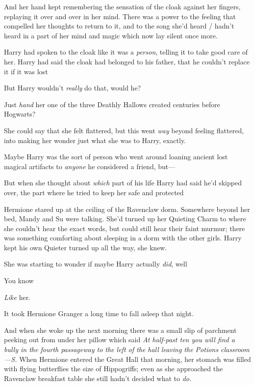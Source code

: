 And her hand kept remembering the sensation of the cloak against her fingers,
replaying it over and over in her mind. There was a power to the feeling that
compelled her thoughts to return to it, and to the song she'd heard / hadn't
heard in a part of her mind and magic which now lay silent once more.

Harry had spoken to the cloak like it was a \emph{person}, telling it to take
good care of her. Harry had said the cloak had belonged to his father, that he
couldn't replace it if it was lost{\el}

But{\el} Harry wouldn't \emph{really} do that, would he?

Just \emph{hand} her one of the three Deathly Hallows created centuries before
Hogwarts?

She could say that she felt flattered, but this went \emph{way} beyond feeling
flattered, into making her wonder just what she was to Harry, exactly.

Maybe Harry was the sort of person who went around loaning ancient lost magical
artifacts to \emph{anyone} he considered a friend, but---

But when she thought about \emph{which} part of his life Harry had said he'd
skipped over, the part where he tried to keep her safe and protected{\el}

Hermione stared up at the ceiling of the Ravenclaw dorm. Somewhere beyond her
bed, Mandy and Su were talking. She'd turned up her Quieting Charm to where she
couldn't hear the exact words, but could still hear their faint murmur; there
was something comforting about sleeping in a dorm with the other girls. Harry
kept his own Quieter turned up all the way, she knew.

She was starting to wonder if maybe Harry actually \emph{did}, well{\el}

You know{\el}

\emph{Like} her.

It took Hermione Granger a long time to fall asleep that night.

And when she woke up the next morning there was a small slip of parchment
peeking out from under her pillow which said \emph{At half-past ten you will
find a bully in the fourth passageway to the left of the hall leaving the
Potions classroom---S.}
\sbreak
When Hermione entered the Great Hall that morning, her stomach was filled with
flying butterflies the size of Hippogriffs; even as she approached the
Ravenclaw breakfast table she still hadn't decided what to \emph{do.}

